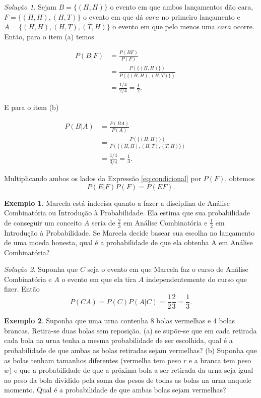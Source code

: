 \documentclass[]{book}
\theoremstyle{definition}
\theoremstyle{definition}
\newtheorem{example}{Exemplo}[chapter]
\theoremstyle{definition}
\theoremstyle{remark}
\newtheorem*{solution}{Solução}
\begin{document}
\begin{solution}
\iffalse{} {Solução. } \fi{}Sejam \(B=\{(H,H)\}\) o evento em que ambos lançamentos dão cara, \(F=\{(H,H),(H,T)\}\) o evento em que dá \(cara\) no primeiro lançamento e \(A=\{(H,H),(H,T),(T,H)\}\) o evento em que pelo menos uma \(cara\) ocorre.
Então, para o item (a) temos

\begin{align}
P(B|F) &= \frac{P(BF)}{P(F)}\\
&=\frac{P(\{(H,H)\})}{P(\{(H,H),(H,T)\})} &&\\
&=\frac{1/4}{2/4}=\frac{1}{2}.
\end{align}

E para o item (b)

\begin{align}
P(B|A) &= \frac{P(BA)}{P(A)}\\
&=\frac{P(\{(H,H)\})}{P(\{(H,H),(H,T),(T,H)\})} &&\\
&=\frac{1/4}{3/4}=\frac{1}{3}.
\end{align}
\end{solution}

Multiplicando ambos os lados da Expressão \eqref{eq:condicional} por \(P(F)\), obtemos
\begin{equation}
P(E|F)P(F) = P(EF).
\label{eq:condicional2}
\end{equation}

\begin{example}
\protect\hypertarget{exm:unnamed-chunk-119}{}{\label{exm:unnamed-chunk-119} }Marcela está indecisa quanto a fazer a disciplina de Análise Combinatória ou Introdução à Probabilidade.
Ela estima que sua probabilidade de conseguir um conceito \(A\) seria de \(\frac{2}{3}\) em Análise Combinatória e \(\frac{1}{2}\) em Introdução à Probabilidade.
Se Marcela decide basear sua escolha no lançamento de uma moeda honesta, qual é a probabilidade de que ela obtenha A em Análise Combinatória?
\end{example}

\begin{solution}
\iffalse{} {Solução. } \fi{}Suponha que \(C\) seja o evento em que Marcela faz o curso de Análise Combinatória e \(A\) o evento em que ela tira \(A\) independentemente do curso que fizer.
Então
\[P(CA) = P(C)P(A|C) = \frac{1}{2}\frac{2}{3} = \frac{1}{3}.\]
\end{solution}

\begin{example}
\protect\hypertarget{exm:unnamed-chunk-121}{}{\label{exm:unnamed-chunk-121} }Suponha que uma urna contenha 8 bolas vermelhas e 4 bolas brancas.
Retira-se duas bolas sem reposição.
(a) se supõe-se que em cada retirada cada bola na urna tenha a mesma probabilidade de ser escolhida, qual é a probabilidade de que ambas as bolas retiradas sejam vermelhas?
(b) Suponha que as bolas tenham tamanhos diferentes (vermelha tem peso \(r\) e a branca tem peso \(w\)) e que a probabilidade de que a próxima bola a ser retirada da urna seja igual ao peso da bola dividido pela soma dos pesos de todas as bolas na urna naquele momento.
Qual é a probabilidade de que ambas bolas sejam vermelhas?
\end{example}
\end{document}

